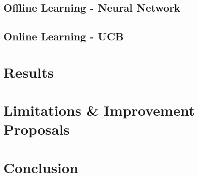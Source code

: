 \documentclass[12pt]{article}
\numberwithin{equation}{section}
\begin{document}
			\paragraph{}


		\subsection{Offline Learning - Neural Network}		\label{sec:implementation.neural_network}

		\subsection{Online Learning - UCB}		\label{sec:implementation.ucb}

	\section{Results}		\label{sec:results}	%

	\section{Limitations \& Improvement Proposals}		\label{sec:limitations_improvements}

	\section{Conclusion}		\label{sec:conclusion}


	
	
\end{document}
